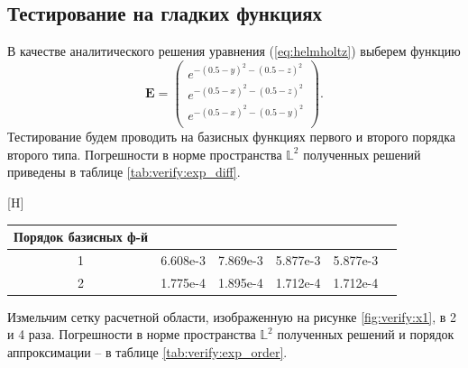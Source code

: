 \documentclass[a4paper,14pt]{article}
\makeatletter
\renewenvironment{table}[1][\fps@table]{
  \edef\@tempa{\noexpand\@float{table}[#1]}
  \@tempa
  \addtocounter{footable}{1}
}{
  \end@float
}
\makeatother
\begin{document}

\subsection{Тестирование на гладких функциях}

В качестве аналитического решения уравнения (\ref{eq:helmholtz}) выберем функцию
\begin{equation}
	\mathbf{E} = \left( \begin{array}{c}
		e^{-(0.5-y)^2 -(0.5-z)^2} \\
		e^{-(0.5-x)^2 -(0.5-z)^2} \\
		e^{-(0.5-x)^2 -(0.5-y)^2} \\
	\end{array} \right) .
	\label{eq:verify:exp_solution}
\end{equation}
Тестирование будем проводить на базисных функциях первого и второго порядка второго типа. Погрешности в норме пространства $\mathbb{L}^2$ полученных решений приведены в таблице \ref{tab:verify:exp_diff}.

\begin{table}[H]
	\caption{относительные погрешности в норме $\mathbb{L}^2$}
	\label{tab:verify:exp_diff}
	\begin{tabularx}{\textwidth}{|C{1}|C{1}|C{1}|C{1}|C{1}|C{1}|}
		\hline Порядок базисных ф-й &  &  &  &  \\
		 & 6.608e-3 & 7.869e-3 & 5.877e-3 & 5.877e-3 \\
		 & 1.775e-4 & 1.895e-4 & 1.712e-4 & 1.712e-4 \\
		\hline
	\end{tabularx}
\end{table}
\vspace{-0.5cm}

Измельчим сетку расчетной области, изображенную на рисунке \ref{fig:verify:x1}, в 2 и 4 раза. Погрешности в норме пространства $\mathbb{L}^2$ полученных решений и порядок аппроксимации -- в таблице \ref{tab:verify:exp_order}.
\end{document}

